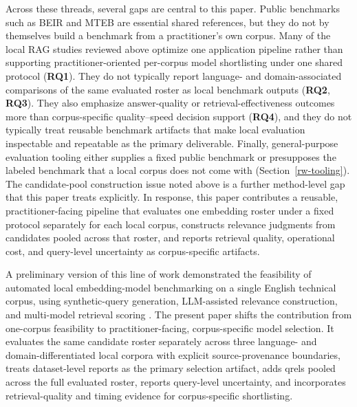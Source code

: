 Across these threads, several gaps are central to this paper. Public benchmarks such as BEIR and MTEB are essential shared references, but they do not by themselves build a benchmark from a practitioner's own corpus. Many of the local RAG studies reviewed above optimize one application pipeline rather than supporting practitioner-oriented per-corpus model shortlisting under one shared protocol (\textbf{RQ1}). They do not typically report language- and domain-associated comparisons of the same evaluated roster as local benchmark outputs (\textbf{RQ2}, \textbf{RQ3}). They also emphasize answer-quality or retrieval-effectiveness outcomes more than corpus-specific quality--speed decision support (\textbf{RQ4}), and they do not typically treat reusable benchmark artifacts that make local evaluation inspectable and repeatable as the primary deliverable. Finally, general-purpose evaluation tooling either supplies a fixed public benchmark or presupposes the labeled benchmark that a local corpus does not come with (Section~\ref{rw-tooling}). The candidate-pool construction issue noted above is a further method-level gap that this paper treats explicitly. In response, this paper contributes a reusable, practitioner-facing pipeline that evaluates one embedding roster under a fixed protocol separately for each local corpus, constructs relevance judgments from candidates pooled across that roster, and reports retrieval quality, operational cost, and query-level uncertainty as corpus-specific artifacts.

A preliminary version of this line of work demonstrated the feasibility of automated local embedding-model benchmarking on a single English technical corpus, using synthetic-query generation, LLM-assisted relevance construction, and multi-model retrieval scoring \citep{Karakaya_Conference_2025}. The present paper shifts the contribution from one-corpus feasibility to practitioner-facing, corpus-specific model selection. It evaluates the same candidate roster separately across three language- and domain-differentiated local corpora with explicit source-provenance boundaries, treats dataset-level reports as the primary selection artifact, adds qrels pooled across the full evaluated roster, reports query-level uncertainty, and incorporates retrieval-quality and timing evidence for corpus-specific shortlisting.
